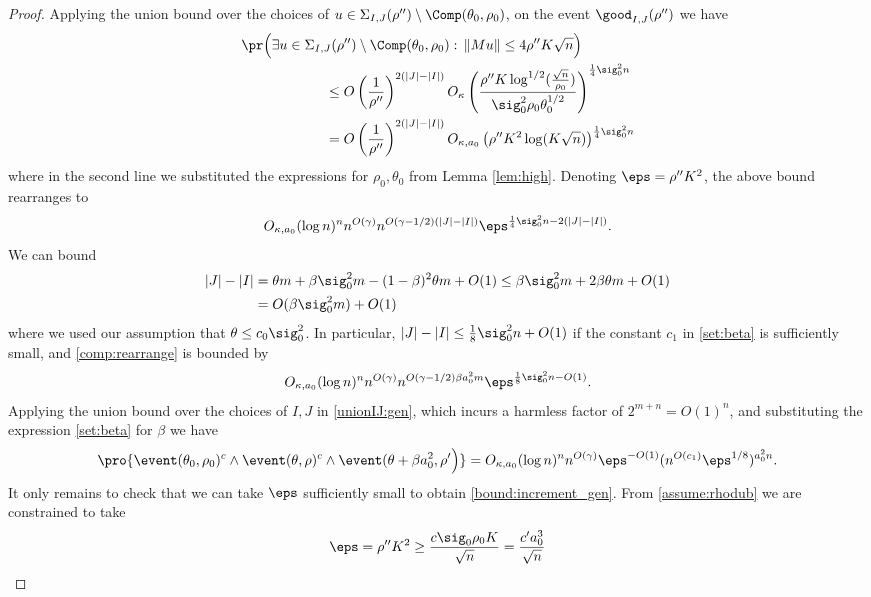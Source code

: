 \documentclass[aop,preprint]{imsart}
\theoremstyle{plain}
\theoremstyle{definition}
\theoremstyle{remark}
\numberwithin{equation}{section}
\numberwithin{theorem}{section}
\begin{document}
\begin{proof}
Applying the union bound over the choices of $u\in \Sigma_{I,J}(\rho'')\setminus \Comp(\theta_0,\rho_0)$, on the event $\good_{I,J}(\rho'')$ we have
\begin{align*}
&\pr\Big( \exists u\in \Sigma_{I,J}(\rho'')\setminus \Comp(\theta_0,\rho_0): \, \|Mu\|\le 4\rho'' K\sqrt{n} \Big) \\
&\qquad\qquad\qquad \le O\left(\frac1{\rho''}\right)^{2(|J|-|I|)} O_\kappa\left(\frac{\rho'' K\log^{1/2}(\frac{\sqrt{n}}{\rho_0})}{\sig_0^2\rho_0 \theta_0^{1/2}}\right)^{\frac14\sig_0^2n}\\
&\qquad\qquad\qquad= O\left(\frac1{\rho''}\right)^{2(|J|-|I|)} O_{\kappa,a_0}\left(\rho''K^2 \log(K\sqrt{n}) \right)^{\frac14\sig_0^2n}
\end{align*}
where in the second line we substituted the expressions for $\rho_0,\theta_0$ from Lemma \ref{lem:high}. 
Denoting $\eps = \rho'' K^2$, the above bound rearranges to 
\begin{equation}	\label{comp:rearrange}
O_{\kappa,a_0}(\log n)^n n^{O(\gamma)} n^{O(\gamma-1/2)(|J|-|I|)} \eps^{\frac14\sig_0^2 n - 2(|J| - |I|)}.
\end{equation}
We can bound
\begin{align*}
|J|-|I| 
&= \theta m + \beta \sig_0^2m - (1-\beta)^2 \theta m + O(1) \le \beta \sig_0^2m +2\beta \theta m + O(1)\\
& = O(\beta \sig_0^2 m) + O(1)
\end{align*}
where we used our assumption that $\theta\le c_0\sig_0^2$. 
In particular, $|J|-|I| \le \frac18 \sig_0^2 n+O(1)$ if the constant $c_1$ in \eqref{set:beta} is sufficiently small, and \eqref{comp:rearrange} is bounded by
\begin{equation}
O_{\kappa,a_0}(\log n)^n n^{O(\gamma)}n^{O(\gamma-1/2) \beta a_0^2 m} \eps^{\frac18\sig_0^2n - O(1) }.
\end{equation}
Applying the union bound over the choices of $I,J$ in \eqref{unionIJ:gen}, which incurs a harmless factor of $2^{m+n} = O(1)^n$, and substituting the expression \eqref{set:beta} for $\beta$ we have
\begin{equation}
\pro{ \event(\theta_0,\rho_0)^c\wedge\event(\theta,\rho)^c \wedge \event(\theta+\beta a_0^2,\rho'\Big)} = O_{\kappa,a_0}(\log n)^n n^{O(\gamma)}\eps^{-O(1)}(n^{O(c_1)} \eps^{1/8})^{a_0^2n}.
\end{equation}
It only remains to check that we can take $\eps$ sufficiently small to obtain \eqref{bound:increment_gen}.
From \eqref{assume:rhodub} we are constrained to take
\[
\eps = \rho'' K^2 \ge \frac{c \sig_0\rho_0K}{\sqrt{n}} = \frac{c' a_0^3 }{\sqrt{n}}
\]
\end{proof}
\end{document}
